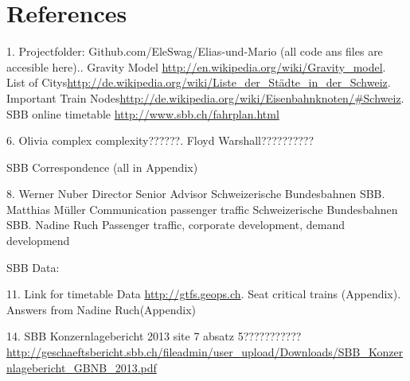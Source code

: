 \documentclass[11pt]{article}
\begin{document}
\section{References}
1. Projectfolder: Github.com/EleSwag/Elias-und-Mario (all code ans files are accesible here).. Gravity Model \url{http://en.wikipedia.org/wiki/Gravity_model}. List of Citys\url{http://de.wikipedia.org/wiki/Liste_der_Städte_in_der_Schweiz}. Important Train Nodes\url{http://de.wikipedia.org/wiki/Eisenbahnknoten/\#Schweiz}. SBB online timetable \url{http://www.sbb.ch/fahrplan.html}\newline

6. Olivia complex complexity??????. Floyd Warshall??????????\newline


SBB Correspondence (all in Appendix)\newline

8. Werner Nuber\newline
Director Senior Advisor\newline
Schweizerische Bundesbahnen SBB. Matthias Müller\newline
Communication passenger traffic\newline
Schweizerische Bundesbahnen SBB. Nadine Ruch\newline
Passenger traffic, corporate development,
demand developmend \newline

SBB Data:\newline

11. Link for timetable Data \url{http://gtfs.geops.ch}. Seat critical trains (Appendix). Answers from Nadine Ruch(Appendix)\newline

14. SBB Konzernlagebericht 2013 site 7 absatz 5???????????\url{http://geschaeftsbericht.sbb.ch/fileadmin/user_upload/Downloads/SBB_Konzernlagebericht_GBNB_2013.pdf}\newline

\appendix
\end{document}
